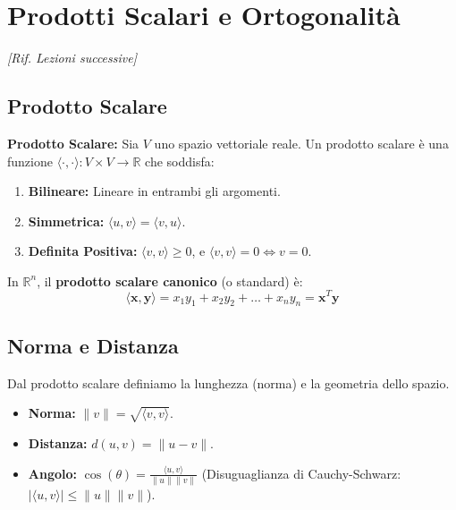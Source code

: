 \section{Prodotti Scalari e Ortogonalità}
\emph{[Rif. Lezioni successive]}

\subsection{Prodotto Scalare}

\begin{definitionbox}
\textbf{Prodotto Scalare:} Sia $V$ uno spazio vettoriale reale. Un prodotto scalare è una funzione $\langle \cdot, \cdot \rangle: V \times V \to \mathbb{R}$ che soddisfa:
\begin{enumerate}
    \item \textbf{Bilineare:} Lineare in entrambi gli argomenti.
    \item \textbf{Simmetrica:} $\langle u, v \rangle = \langle v, u \rangle$.
    \item \textbf{Definita Positiva:} $\langle v, v \rangle \ge 0$, e $\langle v, v \rangle = 0 \iff v=0$.
\end{enumerate}
\end{definitionbox}

\begin{example}
In $\mathbb{R}^n$, il \textbf{prodotto scalare canonico} (o standard) è:
$$ \langle \mathbf{x}, \mathbf{y} \rangle = x_1y_1 + x_2y_2 + \dots + x_ny_n = \mathbf{x}^T \mathbf{y} $$
\end{example}

\subsection{Norma e Distanza}
Dal prodotto scalare definiamo la lunghezza (norma) e la geometria dello spazio.

\begin{definitionbox}
\begin{itemize}
    \item \textbf{Norma:} $\| v \| = \sqrt{\langle v, v \rangle}$.
    \item \textbf{Distanza:} $d(u, v) = \| u - v \|$.
    \item \textbf{Angolo:} $\cos(\theta) = \frac{\langle u, v \rangle}{\|u\| \|v\|}$ (Disuguaglianza di Cauchy-Schwarz: $|\langle u, v \rangle| \le \|u\| \|v\|$).
\end{itemize}
\end{definitionbox}

